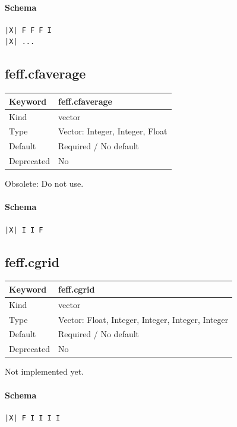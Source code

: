 \documentclass[11pt]{article}
\begin{document}
{{{\paragraph{Schema}
\begin{Verbatim}
|X| F F F I
|X| ...
\end{Verbatim}

\subsection{feff.cfaverage}
\label{kw:feff-cfaverage}
\begin{longtable}{|p{1.5in}|p{4.5in}|}
\hline
Keyword & feff.cfaverage \\
\hline
Kind & vector \\
\hline
Type & Vector: Integer, Integer, Float \\
\hline
Default & Required / No default \\
\hline
Deprecated & No \\
\hline
\end{longtable}
 Obsolete: Do not use.

\paragraph{Schema}
\begin{Verbatim}
|X| I I F
\end{Verbatim}

\subsection{feff.cgrid}
\label{kw:feff-cgrid}
\begin{longtable}{|p{1.5in}|p{4.5in}|}
\hline
Keyword & feff.cgrid \\
\hline
Kind & vector \\
\hline
Type & Vector: Float, Integer, Integer, Integer, Integer \\
\hline
Default & Required / No default \\
\hline
Deprecated & No \\
\hline
\end{longtable}
 Not implemented yet.

\paragraph{Schema}
\begin{Verbatim}
|X| F I I I I
\end{Verbatim}

}}}
\end{document}
